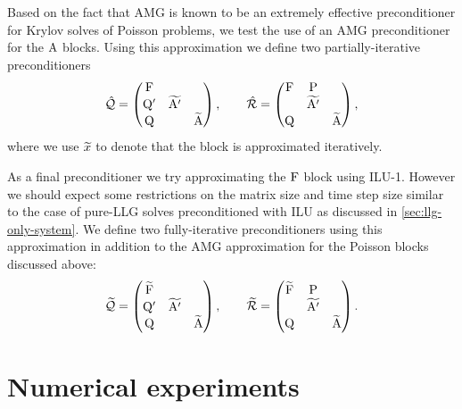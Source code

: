 Based on the fact that AMG is known to be an extremely effective preconditioner for Krylov solves of Poisson problems, we test the use of an AMG preconditioner for the $\mathrm{A}$ blocks.
Using this approximation we define two partially-iterative preconditioners
\begin{equation}
  \hat{\mathcal{Q}} =
  \begin{pmatrix}
    \mathrm{F}       &           &  \\
    \mathrm{Q}'       & \widetilde{\mathrm{A}'} &   \\
    \mathrm{Q}       &           &   \widetilde{\mathrm{A}}
  \end{pmatrix},
  \qquad
  \hat{\mathcal{R}} =
  \begin{pmatrix}
    \mathrm{F}       & \mathrm{P}       &  \\
    & \widetilde{\mathrm{A}'} &   \\
    \mathrm{Q}       &           &  \widetilde{\mathrm{A}}
  \end{pmatrix},
  \label{eq:ms-block-prec-drop-p}
\end{equation}
where we use $\widetilde{x}$ to denote that the block is approximated iteratively.

As a final preconditioner we try approximating the $\mathrm{F}$ block using ILU-1.
However we should expect some restrictions on the matrix size and time step size similar to the case of pure-LLG solves preconditioned with ILU as discussed in \cref{sec:llg-only-system}.
We define two fully-iterative preconditioners using this approximation in addition to the AMG approximation for the Poisson blocks discussed above:
\begin{equation}
  \widetilde{\mathcal{Q}} =
  \begin{pmatrix}
    \widetilde{\mathrm{F}} &           &  \\
    \mathrm{Q}'       & \widetilde{\mathrm{A}'} &   \\
    \mathrm{Q}       &           &   \widetilde{\mathrm{A}}
  \end{pmatrix},
  \qquad
  \widetilde{\mathcal{R}} =
  \begin{pmatrix}
   \widetilde{\mathrm{F}}       & \mathrm{P}       &  \\
    & \widetilde{\mathrm{A}'} &   \\
    \mathrm{Q}       &           &  \widetilde{\mathrm{A}}
  \end{pmatrix}.
  \label{eq:ms-block-prec-drop-p}
\end{equation}


\section{Numerical experiments}
\label{sec:numer-exper-fem-bem-systems}


